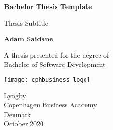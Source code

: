\begin{titlepage}
   \begin{center}
       \vspace*{1cm}

       \textbf{Bachelor Thesis Template}

       \vspace{0.5cm}
        Thesis Subtitle
            
       \vspace{1.5cm}

       \textbf{Adam Saidane}

       \vfill
            
       A thesis presented for the degree of\\
       Bachelor of Software Development
            
       \vspace{0.8cm}
     
       \texttt{[image: cphbusiness\_logo]}
            
       Lyngby\\
       Copenhagen Business Academy\\
       Denmark\\
       October 2020
            
   \end{center}
\end{titlepage}